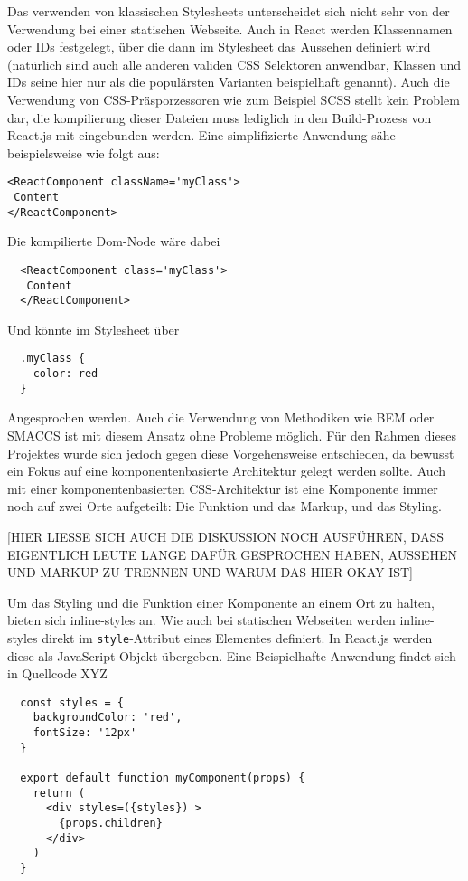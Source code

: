 Das verwenden von klassischen Stylesheets unterscheidet sich nicht sehr von der Verwendung bei einer statischen Webseite. Auch in React werden Klassennamen oder IDs festgelegt, über die dann im Stylesheet das Aussehen definiert wird (natürlich sind auch alle anderen validen CSS Selektoren anwendbar, Klassen und IDs seine hier nur als die populärsten Varianten beispielhaft genannt).
Auch die Verwendung von CSS-Präsporzessoren wie zum Beispiel SCSS stellt kein Problem dar, die kompilierung dieser Dateien muss lediglich in den Build-Prozess von React.js mit eingebunden werden. Eine simplifizierte Anwendung sähe beispielsweise wie folgt aus:

\begin{lstlisting}
<ReactComponent className='myClass'>
 Content
</ReactComponent>
\end{lstlisting}

Die kompilierte Dom-Node wäre dabei

\begin{lstlisting}
  <ReactComponent class='myClass'>
   Content
  </ReactComponent>
\end{lstlisting}

Und könnte im Stylesheet über

\begin{lstlisting}
  .myClass {
    color: red
  }
\end{lstlisting}

Angesprochen werden. Auch die Verwendung von Methodiken wie BEM oder SMACCS ist mit diesem Ansatz ohne Probleme möglich.
Für den Rahmen dieses Projektes wurde sich jedoch gegen diese Vorgehensweise entschieden, da bewusst ein Fokus auf eine komponentenbasierte Architektur gelegt werden sollte. Auch mit einer komponentenbasierten CSS-Architektur ist eine Komponente immer noch auf zwei Orte aufgeteilt: Die Funktion und das Markup, und das Styling.

[HIER LIESSE SICH AUCH DIE DISKUSSION NOCH AUSFÜHREN, DASS EIGENTLICH LEUTE LANGE DAFÜR GESPROCHEN HABEN, AUSSEHEN UND MARKUP ZU TRENNEN UND WARUM DAS HIER OKAY IST]

Um das Styling und die Funktion einer Komponente an einem Ort zu halten, bieten sich inline-styles an. Wie auch bei statischen Webseiten werden inline-styles direkt im \verb|style|-Attribut eines Elementes definiert. In React.js werden diese als JavaScript-Objekt übergeben. Eine Beispielhafte Anwendung findet sich in Quellcode XYZ

\begin{lstlisting}
  const styles = {
    backgroundColor: 'red',
    fontSize: '12px'
  }

  export default function myComponent(props) {
    return (
      <div styles=({styles}) >
  		{props.children}
  	  </div>
    )
  }
\end{lstlisting}


